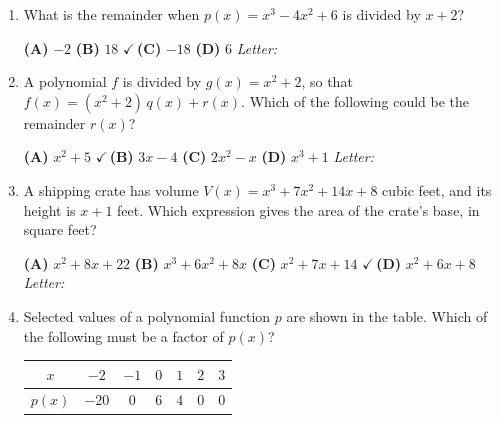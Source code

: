 \documentclass[10pt]{article}
\begin{document}
\begin{enumerate}[leftmargin=1.9em, itemsep=14pt]

\item What is the remainder when $p(x) = x^3 - 4x^2 + 6$ is divided by $x + 2$?

      \smallskip
      \textbf{(A)} $-2$ \hspace{2.6em} \textbf{(B)} $18$ \hspace{2.6em} {\color{keyred}\textbf{$\checkmark$\,(C)}} $-18$ \hspace{2.6em} \textbf{(D)} $6$ \hfill\textit{Letter:}~\gradedblank[id=ap1, type=choice, points=1, answer=C]{0.42in}{13pt}

\item A polynomial $f$ is divided by $g(x) = x^2 + 2$, so that $f(x) = (x^2 + 2)\,q(x) + r(x)$.
      Which of the following could be the remainder $r(x)$?

      \smallskip
      \textbf{(A)} $x^2 + 5$ \hspace{2.6em} {\color{keyred}\textbf{$\checkmark$\,(B)}} $3x - 4$ \hspace{2.6em} \textbf{(C)} $2x^2 - x$ \hspace{2.6em} \textbf{(D)} $x^3 + 1$ \hfill\textit{Letter:}~\gradedblank[id=ap2, type=choice, points=1, answer=B]{0.42in}{13pt}

\item A shipping crate has volume $V(x) = x^3 + 7x^2 + 14x + 8$ cubic feet, and its height is
      $x + 1$ feet. Which expression gives the area of the crate's base, in square feet?

      \smallskip
      \textbf{(A)} $x^2 + 8x + 22$ \hspace{1.6em} \textbf{(B)} $x^3 + 6x^2 + 8x$ \hspace{1.6em} \textbf{(C)} $x^2 + 7x + 14$ \hspace{1.6em} {\color{keyred}\textbf{$\checkmark$\,(D)}} $x^2 + 6x + 8$ \hfill\textit{Letter:}~\gradedblank[id=ap3, type=choice, points=1, answer=D]{0.42in}{13pt}

\item Selected values of a polynomial function $p$ are shown in the table. Which of the
      following must be a factor of $p(x)$?

      \smallskip
      {\renewcommand{\arraystretch}{1.25}%
      \begin{tabular}{|c|c|c|c|c|c|c|}
      \hline $x$ & $-2$ & $-1$ & $0$ & $1$ & $2$ & $3$ \\ \hline
      $p(x)$ & $-20$ & $0$ & $6$ & $4$ & $0$ & $0$ \\ \hline
      \end{tabular}}


\end{enumerate}
\end{document}
